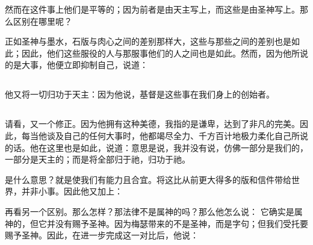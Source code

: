 然而在这件事上他们是平等的；因为前者是由天主写上，而这些是由圣神写上。那么区别在哪里呢？\par

\par

正如圣神与墨水，石版与肉心之间的差别那样大，这些与那些之间的差别也是如此；因此，他们这些服役的人与那服事他们的人之间也是如此。然而，因为他所说的是大事，他便立即抑制自己，说道：\par


\subsection{}

\par

他又将一切归功于天主：因为他说，基督是这些事在我们身上的创始者。\par


\subsection{}

\par

请看，又一个修正。因为他拥有这种美德，我指的是谦卑，达到了非凡的完美。因此，每当他谈及自己的任何大事时，他都竭尽全力、千方百计地极力柔化自己所说的话。他在这里也是如此，说道：意思是说，我并没有说，仿佛一部分是我们的，一部分是天主的；而是将全部归于祂，归功于祂。\par

\par

是什么意思？就是使我们有能力且合宜。将这比从前更大得多的版和信件带给世界，并非小事。因此他又加上：\par

再看另一个区别。那么怎样？那法律不是属神的吗？那么他怎么说： 它确实是属神的，但它并没有赐予圣神。因为梅瑟带来的不是圣神，而是字句；但我们受托要赐予圣神。因此，在进一步完成这一对比后，他说：\par


